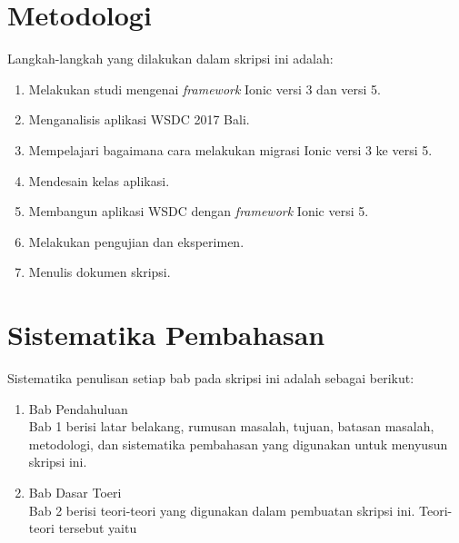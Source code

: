 \section{Metodologi}
\label{sec:metlit}

Langkah-langkah yang dilakukan dalam skripsi ini adalah:

\begin{enumerate}
		\item Melakukan studi mengenai {\it framework} Ionic versi 3 dan versi 5.
		\item Menganalisis aplikasi WSDC 2017 Bali.
		\item Mempelajari bagaimana cara melakukan migrasi Ionic versi 3 ke versi 5.
		\item Mendesain kelas aplikasi.
		\item Membangun aplikasi WSDC dengan {\it framework} Ionic versi 5. 
		\item Melakukan pengujian dan eksperimen.
		\item Menulis dokumen skripsi.
	\end{enumerate}


\section{Sistematika Pembahasan}
\label{sec:sispem}

Sistematika penulisan setiap bab pada skripsi ini adalah sebagai berikut:
\begin{enumerate}
	\item Bab Pendahuluan \\
	Bab 1 berisi latar belakang, rumusan masalah, tujuan, batasan masalah, metodologi, dan sistematika pembahasan yang digunakan untuk menyusun skripsi ini.
	\item Bab Dasar Toeri \\
	Bab 2 berisi teori-teori yang digunakan dalam pembuatan skripsi ini. Teori-teori tersebut yaitu
	\end{enumerate}